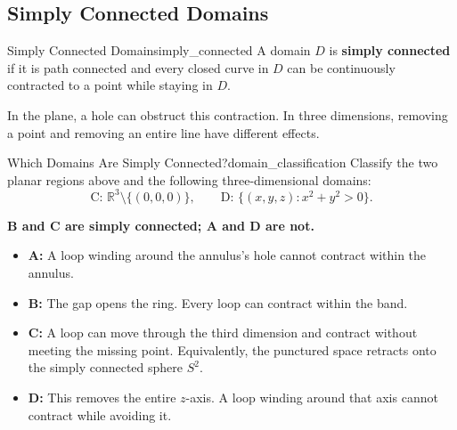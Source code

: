 \subsection{Simply Connected Domains}
\begin{definition}{Simply Connected Domain}{simply_connected}
A domain $D$ is \textbf{simply connected} if it is path connected and every closed curve in $D$ can be continuously contracted to a point while staying in $D$.
\end{definition}
In the plane, a hole can obstruct this contraction. In three dimensions, removing a point and removing an entire line have different effects.
\begin{center}
\end{center}
\begin{problem}{Which Domains Are Simply Connected?}{domain_classification}
Classify the two planar regions above and the following three-dimensional domains:
\[
    \text{C: }\mathbb{R}^3\setminus\{(0,0,0)\},\qquad
    \text{D: }\{(x,y,z):x^2 + y^2 > 0\}.
\]
\end{problem}
\begin{sol}
\textbf{B and C are simply connected; A and D are not.}
\begin{itemize}
    \item \textbf{A:} A loop winding around the annulus's hole cannot contract within the annulus.
    \item \textbf{B:} The gap opens the ring. Every loop can contract within the band.
    \item \textbf{C:} A loop can move through the third dimension and contract without meeting the missing point. Equivalently, the punctured space retracts onto the simply connected sphere $S^2$.
    \item \textbf{D:} This removes the entire $z$-axis. A loop winding around that axis cannot contract while avoiding it.
\end{itemize}
\end{sol}

